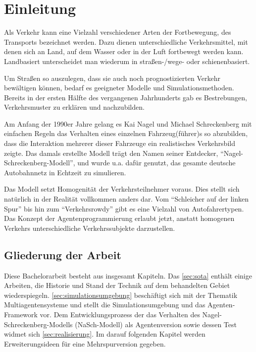 \section{Einleitung}
\label{sec:einleitung}

Als Verkehr kann eine Vielzahl verschiedener Arten der Fortbewegung, des Transports bezeichnet werden. 
Dazu dienen unterschiedliche Verkehrsmittel, mit denen sich an Land, auf dem Wasser oder in der Luft fortbewegt werden kann.
Landbasiert unterscheidet man wiederum in \mbox{straßen-/}wege- oder schienenbasiert.

Um Straßen so auszulegen, dass sie auch noch prognostizierten Verkehr bewältigen können, bedarf es geeigneter Modelle und Simulationsmethoden.
Bereits in der ersten Hälfte des  vergangenen Jahrhunderts gab es Bestrebungen, Verkehrsmuster zu erklären und nachzubilden.

Am Anfang der 1990er Jahre gelang es Kai Nagel und Michael Schreckenberg mit einfachen Regeln das Verhalten eines einzelnen Fahrzeug(führer)s so abzubilden, dass die Interaktion mehrerer dieser Fahrzeuge ein realistisches Verkehrsbild zeigte.
Das damals erstellte Modell trägt den Namen seiner Entdecker, \enquote{Nagel-Schreckenberg-Modell}, und wurde u.a. dafür genutzt, das gesamte deutsche Autobahnnetz in Echtzeit zu simulieren.

Das Modell setzt Homogenität der Verkehrsteilnehmer voraus. 
Dies stellt sich natürlich in der Realität vollkommen anders dar.
Vom \enquote{Schleicher auf der linken Spur} bis hin zum \enquote{Verkehrsrowdy} gibt es eine Vielzahl von Autofahrertypen.
Das Konzept der Agentenprogrammierung erlaubt jetzt, anstatt homogenen Verkehrs unterschiedliche Verkehrssubjekte darzustellen.




\subsection{Gliederung der Arbeit}
\label{sec:gliederung}

Diese Bachelorarbeit besteht aus insgesamt  Kapiteln.
Das \cref{sec:sota} enthält einige Arbeiten, die Historie und Stand der Technik auf dem behandelten Gebiet wiederspiegeln.
\cref{sec:simulationsumgebung} beschäftigt sich mit der Thematik Multiagentensysteme und stellt die Simulationsumgebung und das Agenten-Framework vor.
Dem Entwicklungsprozess der das Verhalten des Nagel-Schreckenberg-Modells (NaSch-Modell) als Agentenversion sowie dessen Test widmet sich \cref{sec:realisierung}.
Im darauf folgenden Kapitel werden Erweiterungsideen für eine Mehrspurversion gegeben.


